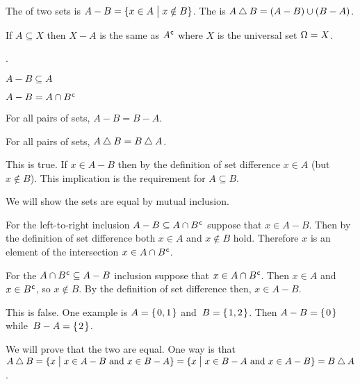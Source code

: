 \documentclass{test}  %
\begin{document}
\begin{df}
The  of two sets is $A-B=\{x\in A \bigm| x\notin B\}$.  
The  is 
$A\mathbin{\triangle} B=(A-B)\cup(B-A)$.
\end{df}

\noindent If $A\subseteq X$ then $X-A$ is the same as ${A}^{\mspace{1mu}\mathsf{c}}$
where $X$ is the universal set $\Omega=X$.     


\begin{ex} \pord.
\begin{exes}
\item $A-B\subseteq A$
\item $A-B=A\cap{B}^{\mspace{1mu}\mathsf{c}}$
\item For all pairs of sets, $A-B=B-A$.
\item For all pairs of sets, $A\mathbin{\triangle} B=B\mathbin{\triangle} A$.
\end{exes}
\begin{ans}
\begin{exes}
\item  This is true.
  If $x\in A-B$
  then by the definition of set difference $x\in A$ (but $x\notin B$).
  This implication is the requirement for $A\subseteq B$.
\item We will show the sets are equal by mutual inclusion.

  For the left-to-right inclusion $A-B\subseteq A\cap {B}^{\mspace{1mu}\mathsf{c}}$
  suppose that $x\in A-B$.
  Then by the definition of set difference both $x\in A$ and $x\notin B$ hold.
  Therefore $x$ is an element of the intersection 
  $x\in A\cap{B}^{\mspace{1mu}\mathsf{c}}$.
  
  For the $A\cap{B}^{\mspace{1mu}\mathsf{c}}\subseteq A-B$ inclusion suppose that
  $x\in A\cap{B}^{\mspace{1mu}\mathsf{c}}$.
  Then $x\in A$ and $x\in{B}^{\mspace{1mu}\mathsf{c}}$, so $x\notin B$.
  By the definition of set difference then, $x\in A-B$.
\item This is false.
  One example is $A=\mbox{$\{\hspace{0.1em}0,1\hspace{0.1em}\}$}$ and~$B=\mbox{$\{\hspace{0.1em}1,2\hspace{0.1em}\}$}$.
  Then $A-B=\mbox{$\{\hspace{0.1em}0\hspace{0.1em}\}$}$ while~$B-A=\mbox{$\{\hspace{0.1em}2\hspace{0.1em}\}$}$.
\item We will prove that the two are equal.
  One way is that 
  $A\mathbin{\triangle} B=\{x \bigm| \text{$x\in A-B$ and $x\in B-A$}\}
              =\{x \bigm| \text{$x\in B-A$ and $x\in A-B$}\}
              =B\mathbin{\triangle} A$.
\end{exes}
\end{ans}
\end{ex}
\end{document}
